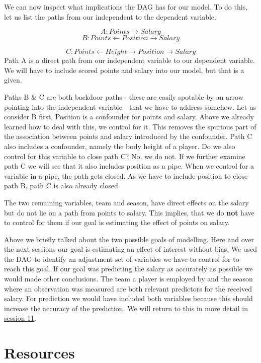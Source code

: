 \documentclass[
]{book}
\begin{document}
We can now inspect what implications the DAG has for our model. To do this,
let us list the paths from our independent to the dependent variable.

\[A: Points \rightarrow Salary\]
\[B: Points \leftarrow Position \rightarrow Salary\]

\[C: Points \leftarrow Height \rightarrow Position \rightarrow Salary\]
Path A is a direct path from our independent variable to our dependent variable.
We will have to include scored points and salary into our model, but that is a
given.

Paths B \& C are both backdoor paths - these are easily spotable by an arrow
pointing into the independent variable - that we have to address somehow.
Let us consider B first. Position is a confounder for points and salary. Above
we already learned how to deal with this, we control for it. This removes
the spurious part of the association between points and salary introduced by the
confounder. Path C also includes a confounder, namely the body height of a player.
Do we also control for this variable to close path C? No, we do not. If we
further examine path C we will see that it also includes position as a pipe.
When we control for a variable in a pipe, the path gets closed. As we have to
include position to close path B, path C is also already closed.

The two remaining variables, team and season, have direct effects on the
salary but do not lie on a path from points to salary. This implies, that we
do \textbf{not} have to control for them if our goal is estimating the effect of
points on salary.

Above we briefly talked about the two possible goals of modelling. Here and over
the next sessions our goal is estimating an effect of interest without bias. We
used the DAG to identify an adjustment set of variables we have to control for
to reach this goal.
If our goal was predicting the salary as accurately as possible we would made
other conclusions. The team a player is employed by and the season where an
observation was measured are both relevant predictors for the received salary.
For prediction we would have included both variables because this should increase
the accuracy of the prediction. We will return to this in more detail in
\protect\hyperlink{pm-t}{session 11}.

\hypertarget{resources}{%
\section{Resources}\label{resources}}
\end{document}
